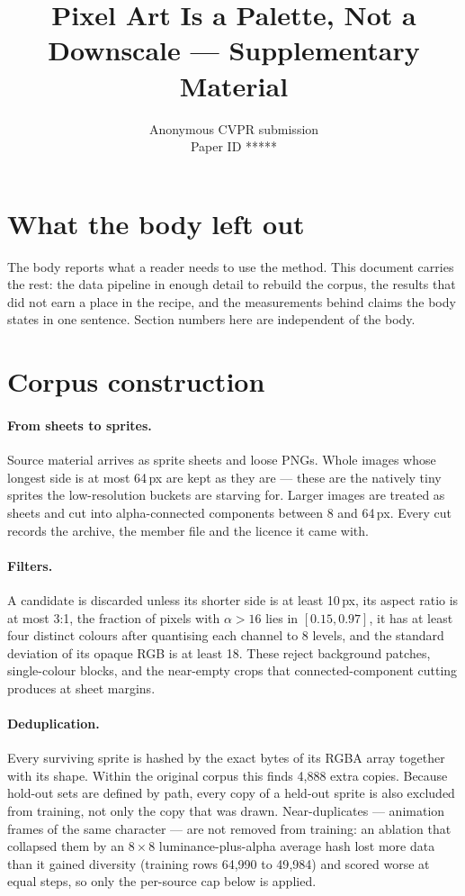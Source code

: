 \documentclass[10pt,twocolumn,letterpaper]{article}
\def\paperID{*****}
\begin{document}
\title{Pixel Art Is a Palette, Not a Downscale --- Supplementary Material}
\author{Anonymous CVPR submission\\Paper ID \paperID}
\maketitle

\section{What the body left out}

The body reports what a reader needs to use the method. This document carries the rest: the data pipeline in enough
detail to rebuild the corpus, the results that did not earn a place in the recipe, and the measurements behind claims
the body states in one sentence. Section numbers here are independent of the body.

\section{Corpus construction}
\label{sup:data}

\paragraph{From sheets to sprites.}
Source material arrives as sprite sheets and loose PNGs. Whole images whose longest side is at most 64\,px are kept as
they are --- these are the natively tiny sprites the low-resolution buckets are starving for. Larger images are treated
as sheets and cut into alpha-connected components between 8 and 64\,px. Every cut records the archive, the member file
and the licence it came with.

\paragraph{Filters.}
A candidate is discarded unless its shorter side is at least 10\,px, its aspect ratio is at most 3:1, the fraction of
pixels with $\alpha > 16$ lies in $[0.15, 0.97]$, it has at least four distinct colours after quantising each channel
to 8 levels, and the standard deviation of its opaque RGB is at least 18. These reject background patches, single-colour
blocks, and the near-empty crops that connected-component cutting produces at sheet margins.

\paragraph{Deduplication.}
Every surviving sprite is hashed by the exact bytes of its RGBA array together with its shape. Within the original
corpus this finds 4{,}888 extra copies. Because hold-out sets are defined by path, every copy of a held-out sprite is
also excluded from training, not only the copy that was drawn. Near-duplicates --- animation frames of the same
character --- are not removed from training: an ablation that collapsed them by an $8\times8$ luminance-plus-alpha
average hash lost more data than it gained diversity (training rows 64{,}990 to 49{,}984) and scored worse at equal
steps, so only the per-source cap below is applied.
\end{document}
